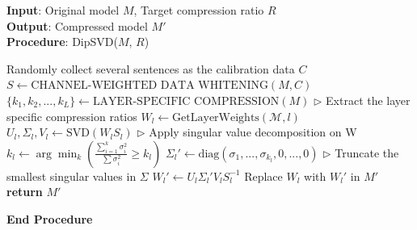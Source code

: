\documentclass[11pt]{article}
\begin{document}
\begin{algorithm*}[ht]
    \caption{Pseudocode of DipSVD}
    \textbf{Input}: Original model $M$, Target compression ratio $R$ \\
    \textbf{Output}: Compressed model $M'$ \\
    \textbf{Procedure}: DipSVD($M$, $R$)
    
    \begin{algorithmic}[1] %
        \State Randomly collect several sentences as the calibration data $C$
        \State $S \gets \text{CHANNEL-WEIGHTED DATA WHITENING}(M,C)$  
        \State $\{k_1, k_2, ...,k_L\} \gets \text{LAYER-SPECIFIC COMPRESSION}(M)$ \hfill{$\triangleright$ Extract the layer specific compression ratios}
            \State $W_l \gets \text{GetLayerWeights}(\mathcal{M}, l)$ \hfill {}
            \State $U_l,\Sigma_l, V_l \gets \text{SVD}(W_lS_l)$ \hfill {$\triangleright$ Apply singular value decomposition on W}
            \State $k_l \gets \arg\min_k \left(\frac{\sum_{i=1}^k \sigma_i^2}{\sum \sigma_i^2} \geq k_l\right)$
            \State $\Sigma_l' \gets \text{diag}(\sigma_1,...,\sigma_{k_l},0,...,0)$  \hfill {$\triangleright$ Truncate the smallest singular values in $\Sigma$}
            \State $W_l' \gets U_l \Sigma_l' V_l S_l^{-1}$
            \State Replace $W_l$ with $ W_l'$ in $M'$
        \EndFor
        \State \textbf{return} $M'$ 
    \end{algorithmic}
\textbf{End Procedure}
\label{algorithm1}
\end{algorithm*}
\end{document}
